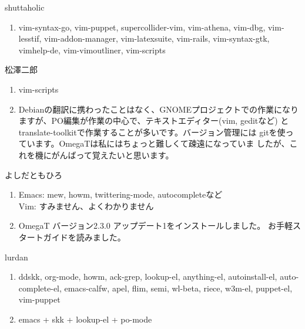 \documentclass[mingoth,a4paper]{jsarticle}
\begin{document}
\begin{prework}{ shuttaholic }
 \begin{enumerate}
  \item vim-syntax-go, vim-puppet, supercollider-vim, vim-athena,
        vim-dbg, vim-lesstif, vim-addon-manager, vim-latexsuite,
        vim-rails, vim-syntax-gtk, vimhelp-de, vim-vimoutliner,
        vim-scripts
 \end{enumerate}
\end{prework}

\begin{prework}{ 松澤二郎 }
 \begin{enumerate}
  \item vim-scripts
  \item Debianの翻訳に携わったことはなく、GNOMEプロジェクトでの作業になり
        ますが、PO編集が作業の中心で、テキストエディター(vim, geditなど)
        とtranslate-toolkitで作業することが多いです。バージョン管理には
        gitを使っています。OmegaTは私にはちょっと難しくて疎遠になっていま
        したが、これを機にがんばって覚えたいと思います。
 \end{enumerate}
\end{prework}

\begin{prework}{ よしだともひろ }
 \begin{enumerate}
  \item Emacs: mew, howm, twittering-mode, autocompleteなど \\
        Vim: すみません、よくわかりません
  \item OmegaT バージョン2.3.0 アップデート1をインストールしました。
        お手軽スタートガイドを読みました。
 \end{enumerate}
\end{prework}

\begin{prework}{ lurdan }
 \begin{enumerate}
  \item ddskk, org-mode, howm, ack-grep, lookup-el, anything-el,
        autoinstall-el, auto-complete-el, emacs-calfw, apel, flim, semi,
        wl-beta, riece, w3m-el, puppet-el, vim-puppet
  \item emacs + skk + lookup-el + po-mode
 \end{enumerate}
\end{prework}


\clearpage
\end{document}

